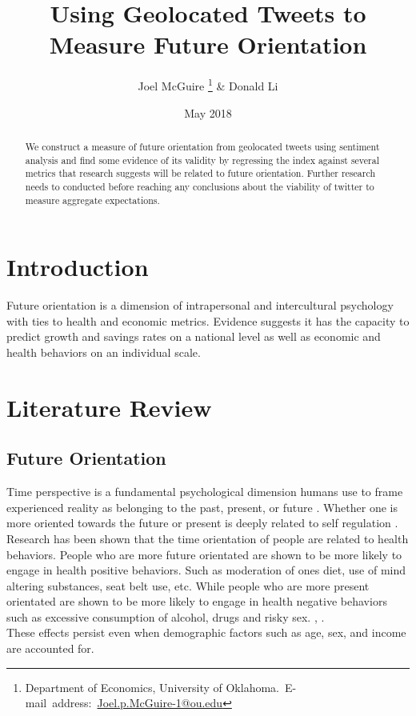 \documentclass{article}
\title{Using Geolocated Tweets to Measure Future Orientation}
\author{Joel McGuire \thanks{Department of Economics, University of Oklahoma.\
E-mail~address:~\href{mailto:
joel.p.mcguire-1@ou.edu}{Joel.p.McGuire-1@ou.edu}} & Donald Li }
\date{May 2018}
\begin{document}
\maketitle



\begin{abstract}
\begin{singlespace}
We construct a measure of future orientation from geolocated tweets using sentiment analysis and find some evidence of its validity by regressing the index against several metrics that research suggests will be related to future orientation. Further research needs to conducted before reaching any conclusions about the viability of twitter to measure aggregate expectations. 
\end{singlespace}

\end{abstract}
\vfill{}


\pagebreak{}


\section{Introduction}
Future orientation is a dimension of intrapersonal and intercultural psychology with ties to health and economic metrics. Evidence suggests it has the capacity to predict growth and savings rates on a national level as well as economic and health behaviors on an individual scale.

\section{Literature Review}

\subsection{Future Orientation}


Time perspective is a fundamental psychological dimension humans use to frame experienced reality as belonging to the past, present, or future \citep{zimbardo2015putting}. Whether one is more oriented towards the future or present is deeply related to self regulation \citep{howlett2008role}. Research has been shown that the time orientation of people are related to health behaviors. People who are more future orientated are shown to be more likely to engage in health positive behaviors. Such as moderation of ones diet, use of mind altering substances, seat belt use, etc. While people who are more present orientated are shown to be more likely to engage in health negative behaviors such as excessive consumption of alcohol, drugs and risky sex.  \cite{henson2006associations},  \cite{daugherty2010taking}.\\ These effects persist even when demographic factors such as age, sex, and income are accounted for. 
\end{document}
